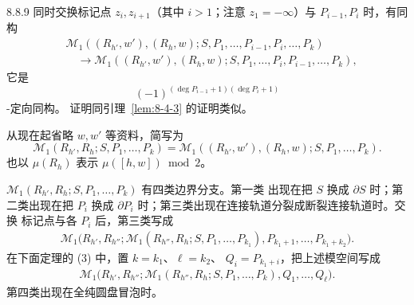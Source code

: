 \begin{remark}{8.8.9}\label{rem:8-8-9}
同时交换标记点 $z_i,z_{i+1}$（其中 $i>1$；注意 $z_1=-\infty$）与
$P_{i-1},P_i$ 时，有同构
\[
\begin{aligned}
 &\mathcal M_1
 ((R_{h'},w'),(R_h,w);
 S,P_1,\ldots,P_{i-1},P_i,\ldots,P_k)\\
 &\quad\longrightarrow
 \mathcal M_1
 ((R_{h'},w'),(R_h,w);
 S,P_1,\ldots,P_i,P_{i-1},\ldots,P_k),
\end{aligned}
\]
它是
\[
 (-1)^{(\deg P_{i-1}+1)(\deg P_i+1)}
\]
-定向同构。%
证明同引理~\ref{lem:8-4-3} 的证明类似。
\end{remark}

从现在起省略 $w,w'$ 等资料，简写为
\[
 \mathcal M_1(R_{h'},R_h;S,P_1,\ldots,P_k)
 =
 \mathcal M_1
 ((R_{h'},w'),(R_h,w);S,P_1,\ldots,P_k).
\]
也以 $\mu(R_h)$ 表示 $\mu([h,w])\bmod2$。

$\mathcal M_1(R_{h'},R_h;S,P_1,\ldots,P_k)$ 有四类边界分支。第一类
出现在把 $S$ 换成 $\partial S$ 时；第二类出现在把 $P_i$ 换成
$\partial P_i$ 时；第三类出现在连接轨道分裂成断裂连接轨道时。交换
标记点与各 $P_i$ 后，第三类写成
\[
\begin{aligned}
 \mathcal M_1\bigl(
 R_{h'},R_{h''};
 \mathcal M_1(R_{h''},R_h;S,P_1,\ldots,P_{k_1}),
 P_{k_1+1},\ldots,P_{k_1+k_2}
 \bigr).
\end{aligned}
\]
在下面定理的 (3) 中，置 $k=k_1$、$\ell=k_2$、
$Q_i=P_{k_1+i}$，把上述模空间写成
\[
\begin{aligned}
 \mathcal M_1\bigl(
 R_{h'},R_{h''};
 \mathcal M_1(R_{h''},R_h;S,P_1,\ldots,P_k),
 Q_1,\ldots,Q_\ell
 \bigr).
\end{aligned}
\]
第四类出现在全纯圆盘冒泡时。

